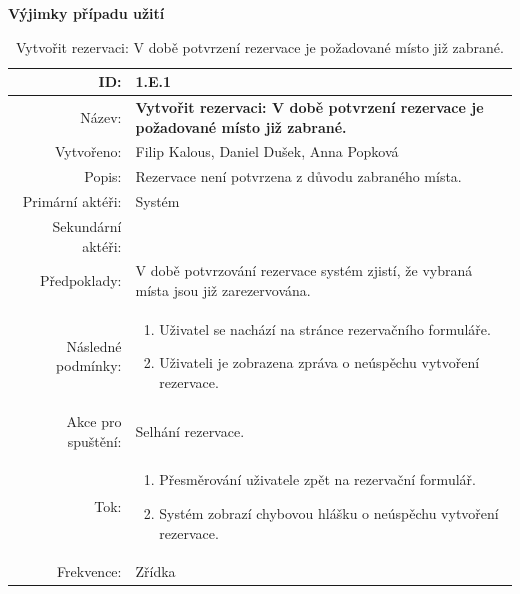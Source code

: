 \par{\textbf{Výjimky případu užití }}
\begin{table}[ht!]
{\renewcommand{\arraystretch}{1.3}
\begin{tabular}{| r | p{12cm} |}
	\hline
	ID: & 1.E.1 \\
    \hline
    Název: & \textbf{Vytvořit rezervaci: V době potvrzení rezervace je požadované místo již zabrané.} \\
    \hline
    Vytvořeno: & Filip Kalous, Daniel Dušek, Anna Popková \\
    \hline
    Popis: & Rezervace není potvrzena z důvodu zabraného místa. \\
    \hline
    Primární aktéři: & Systém \\
    \hline
    Sekundární aktéři: &  \\
    \hline
    Předpoklady: & V době potvrzování rezervace systém zjistí, že vybraná místa jsou již zarezervována.  \\
    \hline
    Následné podmínky: & 
	\begin{minipage}[t]{0.75\textwidth}
 		\begin{enumerate}[nosep,after=\strut]
 			\item Uživatel se nachází na stránce rezervačního formuláře.
 			\item Uživateli je zobrazena zpráva o neúspěchu vytvoření rezervace.
 		\end{enumerate}
    \end{minipage} \\
	\hline
    Akce pro spuštění: & Selhání rezervace. \\
    \hline
    Tok: & 
    \begin{minipage}[t]{0.75\textwidth}
    	\begin{enumerate}[nosep,after=\strut]
            \item Přesměrování uživatele zpět na rezervační formulář.
            \item Systém zobrazí chybovou hlášku o neúspěchu vytvoření rezervace.
    	\end{enumerate}
    \end{minipage} \\
    \hline
    Frekvence: & Zřídka \\
    \hline

\end{tabular}}
\caption{Vytvořit rezervaci: V době potvrzení rezervace je požadované místo již zabrané.}
\label{table:2}
\end{table}


